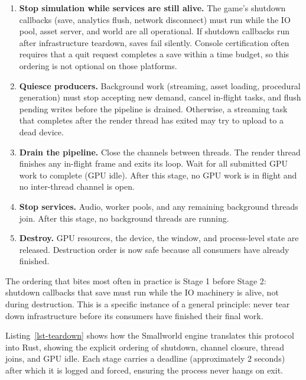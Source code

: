 \documentclass[
  11pt,
  letterpaper,
  DIV=11,
  numbers=noendperiod,
  twoside,
  open=right]{scrreprt}
\newcommand{\floattop}{%
  \floatplacement{codelisting}{!t}%
  \AfterEndEnvironment{codelisting}{\floatplacement{codelisting}{!htbp}}%
}
\begin{document}
\begin{enumerate}
\def\labelenumi{\arabic{enumi}.}
\item
  \textbf{Stop simulation while services are still alive.} The game's
  shutdown callbacks (save, analytics flush, network disconnect) must
  run while the IO pool, asset server, and world are all operational. If
  shutdown callbacks run after infrastructure teardown, saves fail
  silently. Console certification often requires that a quit request
  completes a save within a time budget, so this ordering is not
  optional on those platforms.
\item
  \textbf{Quiesce producers.} Background work (streaming, asset loading,
  procedural generation) must stop accepting new demand, cancel
  in-flight tasks, and flush pending writes before the pipeline is
  drained. Otherwise, a streaming task that completes after the render
  thread has exited may try to upload to a dead device.
\item
  \textbf{Drain the pipeline.} Close the channels between threads. The
  render thread finishes any in-flight frame and exits its loop. Wait
  for all submitted GPU work to complete (GPU idle). After this stage,
  no GPU work is in flight and no inter-thread channel is open.
\item
  \textbf{Stop services.} Audio, worker pools, and any remaining
  background threads join. After this stage, no background threads are
  running.
\item
  \textbf{Destroy.} GPU resources, the device, the window, and
  process-level state are released. Destruction order is now safe
  because all consumers have already finished.
\end{enumerate}

The ordering that bites most often in practice is Stage 1 before Stage
2: shutdown callbacks that save must run while the IO machinery is
alive, not during destruction. This is a specific instance of a general
principle: never tear down infrastructure before its consumers have
finished their final work.

Listing~\ref{lst-teardown} shows how the Smallworld engine translates
this protocol into Rust, showing the explicit ordering of shutdown,
channel closure, thread joins, and GPU idle. Each stage carries a
deadline (approximately 2 seconds) after which it is logged and forced,
ensuring the process never hangs on exit.

\floattop
\end{document}
